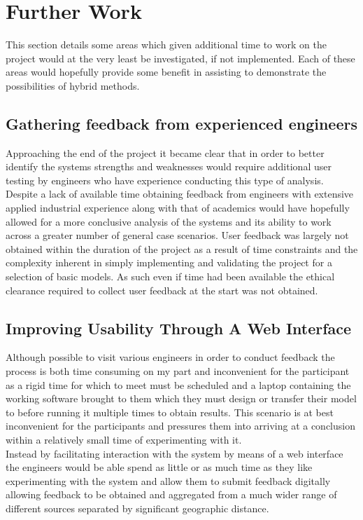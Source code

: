 
\section{Further Work}
This section details some areas which given additional time to work on the project would at the very least be investigated, if not implemented. Each of these areas would hopefully provide some benefit in assisting to demonstrate the possibilities of hybrid methods.

\subsection{Gathering feedback from experienced engineers}
Approaching the end of the project it became clear that in order to better identify the systems strengths and weaknesses would require additional user testing by engineers who have experience conducting this type of analysis. Despite a lack of available time obtaining feedback from engineers with extensive applied industrial experience along with that of academics would have hopefully allowed for a more conclusive analysis of the systems and its ability to work across a greater number of general case scenarios. 
User feedback was largely not obtained within the duration of the project as a result of time constraints and the complexity inherent in simply implementing and validating the project for a selection of basic models. As such even if time had been available the ethical clearance required to collect user feedback at the start was not obtained.


\subsection{Improving Usability Through A Web Interface}
Although possible to visit various engineers in order to conduct feedback the process is both time consuming on my part and inconvenient for the participant as a rigid time for which to meet must be scheduled and a laptop containing the working software brought to them which they must design or transfer their model to before running it multiple times to obtain results. This scenario is at best inconvenient for the participants and pressures them into arriving at a conclusion within a relatively small time of experimenting with it. \\ 

\noindent
Instead by facilitating interaction with the system by means of a web interface the engineers would be able spend as little or as much time as they like experimenting with the system and allow them to submit feedback digitally allowing feedback to be obtained and aggregated from a much wider range of different sources separated by significant geographic distance. \\\ 


